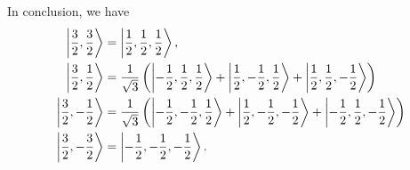 \documentclass[12pt]{article}
\theoremstyle{definition}
\theoremstyle{definition}
\theoremstyle{definition}
\theoremstyle{definition}
\theoremstyle{definition}
\theoremstyle{example}
\theoremstyle{note}
\theoremstyle{remark}
\theoremstyle{example}
\begin{document}
 							In conclusion, we have 
 							\begin{align*}
 								 \ket{\frac32, \frac32} &= \ket{\frac12, \frac12, \frac12}, \\ \ket{\frac32, \frac12} &= \frac{1}{\sqrt{3}} \left(\ket{-\frac12, \frac12 , \frac12} + \ket{\frac12, - \frac12 , \frac12} + \ket{\frac12, \frac12, -\frac12}\right) \\
 								 \ket{\frac32, -\frac12} &= \frac{1}{\sqrt{3}} \left(\ket{-\frac12 , -\frac12, \frac12} + \ket{\frac12, -\frac12, -\frac12} + \ket{-\frac12, \frac12, -\frac12}\right) \\ \ket{\frac32, -\frac32} &= \ket{-\frac12, -\frac12 , -\frac12}.
 							\end{align*}
	
\end{document}
